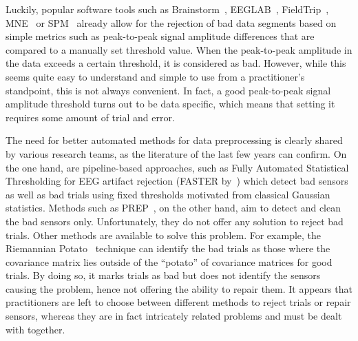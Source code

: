 Luckily, popular software tools such as
Brainstorm~\citep{tadel2011brainstorm}, 
EEGLAB~\citep{delorme2004eeglab}, 
FieldTrip~\citep{oostenveld2010fieldtrip},
MNE~\citep{gramfort2013meg}
or SPM~\citep{litvak2011eeg} already allow for the rejection of bad data segments based on simple metrics such as peak-to-peak signal amplitude differences that are compared to a manually set threshold value. When the peak-to-peak amplitude in the data exceeds a certain threshold, it is considered as bad. However, while this seems quite easy to understand and simple to use from a practitioner's standpoint, this is not always convenient. In fact, a good peak-to-peak signal amplitude threshold turns out to be data specific, which means that setting it requires some amount of trial and error.

The need for better automated methods for data preprocessing is clearly shared by various research teams, as the literature of the last few years can confirm. On the one hand, are pipeline-based approaches, such as Fully Automated Statistical Thresholding for EEG artifact rejection (FASTER by~\citet{nolan2010faster}) which detect bad sensors as well as bad trials using fixed thresholds motivated from classical Gaussian statistics. Methods such as PREP~\citep{bigdely2015prep}, on the other hand, aim to detect and clean the bad sensors only. Unfortunately, they do not offer any solution to reject bad trials. Other methods are available to solve this problem. For example, the Riemannian Potato~\citep{barachant2013riemannian} technique can identify the bad trials as those where the covariance matrix lies outside of the ``potato'' of covariance matrices for good trials. By doing so, it marks trials as bad but does not identify the sensors causing the problem, hence not offering the ability to repair them. It appears that practitioners are left to choose between different methods to reject trials or repair sensors, whereas they are in fact intricately related problems and must be dealt with together. 


